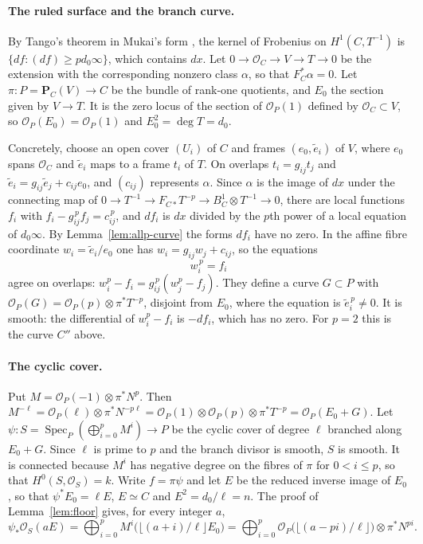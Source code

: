 \documentclass[11pt,a4paper]{article}
\theoremstyle{plain}
\theoremstyle{remark}
\newcommand{\OO}{\mathcal O}
\newcommand{\PP}{\mathbf P}
\newcommand{\Spec}{\operatorname{Spec}}
\begin{document}
\paragraph{The ruled surface and the branch curve.} By Tango's theorem in Mukai's form \cite[Theorem~1, p.~1]{Mukai},
the kernel of Frobenius on $H^1(C,T^{-1})$ is $\{df : (df)\geq pd_0\infty\}$, which contains $dx$. Let
$0\to\OO_C\to V\to T\to0$ be the extension with the corresponding nonzero class $\alpha$, so that $F_C^*\alpha=0$. Let
$\pi:P=\PP_C(V)\to C$ be the bundle of rank-one quotients, and $E_0$ the section given by $V\to T$. It is the zero locus
of the section of $\OO_P(1)$ defined by $\OO_C\subset V$, so $\OO_P(E_0)=\OO_P(1)$ and $E_0^2=\deg T=d_0$.

Concretely, choose an open cover $(U_i)$ of $C$ and frames $(e_0,\tilde e_i)$ of $V$, where $e_0$ spans $\OO_C$ and
$\tilde e_i$ maps to a frame $t_i$ of $T$. On overlaps $t_i=g_{ij}t_j$ and $\tilde e_i=g_{ij}\tilde e_j+c_{ij}e_0$, and
$(c_{ij})$ represents $\alpha$. Since $\alpha$ is the image of $dx$ under the connecting map of
$0\to T^{-1}\to F_{C*}T^{-p}\to B^1_C\otimes T^{-1}\to0$, there are local functions $f_i$ with
$f_i-g_{ij}^{\,p}f_j=c_{ij}^{\,p}$, and $df_i$ is $dx$ divided by the $p$th power of a local equation of $d_0\infty$.
By Lemma~\ref{lem:allp-curve} the forms $df_i$ have no zero. In the affine fibre coordinate $w_i=\tilde e_i/e_0$ one has
$w_i=g_{ij}w_j+c_{ij}$, so the equations
\[
 w_i^{\,p}=f_i
\]
agree on overlaps: $w_i^p-f_i=g_{ij}^{\,p}(w_j^p-f_j)$. They define a curve $G\subset P$ with
$\OO_P(G)=\OO_P(p)\otimes\pi^*T^{-p}$, disjoint from $E_0$, where the equation is $\tilde e_i^{\,p}\ne0$. It is smooth:
the differential of $w_i^p-f_i$ is $-df_i$, which has no zero. For $p=2$ this is the curve $C''$ above.

\paragraph{The cyclic cover.} Put $M=\OO_P(-1)\otimes\pi^*N^{p}$. Then
$M^{-\ell}=\OO_P(\ell)\otimes\pi^*N^{-p\ell}=\OO_P(1)\otimes\OO_P(p)\otimes\pi^*T^{-p}=\OO_P(E_0+G)$. Let
$\psi:S=\Spec_P(\bigoplus_{i=0}^{p}M^i)\to P$ be the cyclic cover of degree $\ell$ branched along $E_0+G$. Since $\ell$
is prime to $p$ and the branch divisor is smooth, $S$ is smooth. It is connected because $M^i$ has negative degree on
the fibres of $\pi$ for $0<i\leq p$, so that $H^0(S,\OO_S)=k$. Write $f=\pi\psi$ and let $E$ be the reduced inverse
image of $E_0$, so that $\psi^*E_0=\ell E$, $E\simeq C$ and $E^2=d_0/\ell=n$. The proof of Lemma~\ref{lem:floor} gives,
for every integer $a$,
\begin{equation}\label{eq:allp-eigen}
 \psi_*\OO_S(aE)=\bigoplus_{i=0}^{p}M^i\bigl(\lfloor(a+i)/\ell\rfloor E_0\bigr)
 =\bigoplus_{i=0}^{p}\OO_P\bigl(\lfloor(a-pi)/\ell\rfloor\bigr)\otimes\pi^*N^{pi}.
\end{equation}
\end{document}
